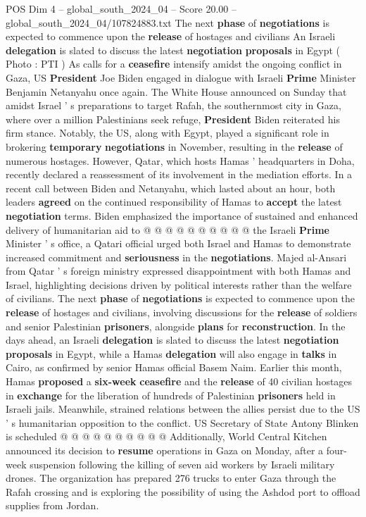 \begin{textsample}{POS Dim 4 – global\_south\_2024\_04 – Score 20.00 – global\_south\_2024\_04/107824883.txt}  \label{ex:f4_pos_268}
The next \textbf{phase} of \textbf{negotiations} is expected to commence upon the \textbf{release} of hostages and civilians An Israeli \textbf{delegation} is slated to discuss the latest \textbf{negotiation} \textbf{proposals} in Egypt ( Photo : PTI ) As calls for a \textbf{ceasefire} intensify amidst the ongoing conflict in Gaza, US \textbf{President} Joe Biden engaged in dialogue with Israeli \textbf{Prime} Minister Benjamin Netanyahu once again.
The White House announced on Sunday that amidst Israel ' s preparations to target Rafah, the southernmost city in Gaza, where over a million Palestinians seek refuge, \textbf{President} Biden reiterated his firm stance.
Notably, the US, along with Egypt, played a significant role in brokering \textbf{temporary} \textbf{negotiations} in November, resulting in the \textbf{release} of numerous hostages.
However, Qatar, which hosts Hamas ' headquarters in Doha, recently declared a reassessment of its involvement in the mediation efforts.
In a recent call between Biden and Netanyahu, which lasted about an hour, both leaders \textbf{agreed} on the continued responsibility of Hamas to \textbf{accept} the latest \textbf{negotiation} terms.
Biden emphasized the importance of sustained and enhanced delivery of humanitarian aid to @ @ @ @ @ @ @ @ @ @ the Israeli \textbf{Prime} Minister ' s office, a Qatari official urged both Israel and Hamas to demonstrate increased commitment and \textbf{seriousness} in the \textbf{negotiations}.
Majed al-Ansari from Qatar ' s foreign ministry expressed disappointment with both Hamas and Israel, highlighting decisions driven by political interests rather than the welfare of civilians.
The next \textbf{phase} of \textbf{negotiations} is expected to commence upon the \textbf{release} of hostages and civilians, involving discussions for the \textbf{release} of soldiers and senior Palestinian \textbf{prisoners}, alongside \textbf{plans} for \textbf{reconstruction}.
In the days ahead, an Israeli \textbf{delegation} is slated to discuss the latest \textbf{negotiation} \textbf{proposals} in Egypt, while a Hamas \textbf{delegation} will also engage in \textbf{talks} in Cairo, as confirmed by senior Hamas official Basem Naim.
Earlier this month, Hamas \textbf{proposed} a \textbf{six-week} \textbf{ceasefire} and the \textbf{release} of 40 civilian hostages in \textbf{exchange} for the liberation of hundreds of Palestinian \textbf{prisoners} held in Israeli jails.
Meanwhile, strained relations between the allies persist due to the US ' s humanitarian opposition to the conflict.
US Secretary of State Antony Blinken is scheduled @ @ @ @ @ @ @ @ @ @ Additionally, World Central Kitchen announced its decision to \textbf{resume} operations in Gaza on Monday, after a four-week suspension following the killing of seven aid workers by Israeli military drones.
The organization has prepared 276 trucks to enter Gaza through the Rafah crossing and is exploring the possibility of using the Ashdod port to offload supplies from Jordan.


\end{textsample}
